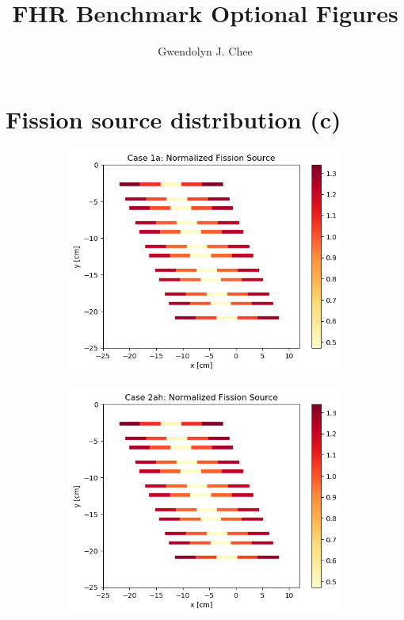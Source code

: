 \documentclass[letterpaper,11pt]{report}
\author{Gwendolyn J. Chee}
\title{FHR Benchmark Optional Figures }
\begin{document}
\maketitle

\section{Fission source distribution (c)}
\begin{figure}[H]
    \centering
    \begin{subfigure}{.33\textwidth}
        \centering
        \includegraphics[width=\linewidth]{../../phase1a/case1a/analysis_output/p1a_1a_c.png}
        \caption{}
      \end{subfigure}%
      \begin{subfigure}{.33\textwidth}
        \centering
        \includegraphics[width=\linewidth]{../../phase1a/case2ah/analysis_output/p1a_2ah_c.png}

\end{subfigure}
\end{figure}
\end{document}
